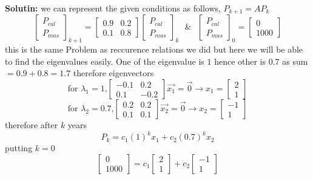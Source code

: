 \documentclass[a4paper,11pt]{article}
\numberwithin{equation}{section}
\begin{document}
\begin{itemize}
\textbf{Solutin: }we can represent the given conditions as follows, $P_{k+1}=AP_k$
\[
\begin{bmatrix}
    P_{cal}\\P_{mas}
\end{bmatrix}_{k+1}=
\begin{bmatrix}
    0.9&0.2\\0.1&0.8
\end{bmatrix}
\begin{bmatrix}
    P_{cal}\\P_{mas}
\end{bmatrix}_{k} \hspace{8pt} \& \hspace{8pt}
\begin{bmatrix}
    P_{cal}\\P_{mas}
\end{bmatrix}_{0}=
\begin{bmatrix}
    0\\1000
\end{bmatrix}
\]
this is the same Problem as reccurence relations we did but here we will be able to find the eigenvalues easily. One of the eigenvalue is $1$ hence other is $0.7$ as sum$=0.9+0.8=1.7$ therefore eigenvectors\\
\[
\text{for $\lambda_1=1$,} \begin{bmatrix}
    -0.1&0.2\\0.1&-0.2
\end{bmatrix}\vec{x_1}=\vec{0} \rightarrow x_1=\begin{bmatrix}
    2\\1
\end{bmatrix}
\]
\[
\text{for $\lambda_2=0.7$,} \begin{bmatrix}
    0.2&0.2\\0.1&0.1
\end{bmatrix}\vec{x_2}=\vec{0} \rightarrow x_2=\begin{bmatrix}
    -1\\1
\end{bmatrix}
\]
therefore after $k$ years
\[
P_k=c_1(1)^kx_1+c_2(0.7)^kx_2
\]
putting $k=0$
\[
\begin{bmatrix}
    0\\1000
\end{bmatrix}=c_1\begin{bmatrix}
    2\\1
\end{bmatrix}+c_2\begin{bmatrix}
    -1\\1

\end{bmatrix}\]
\end{itemize}
\end{document}
